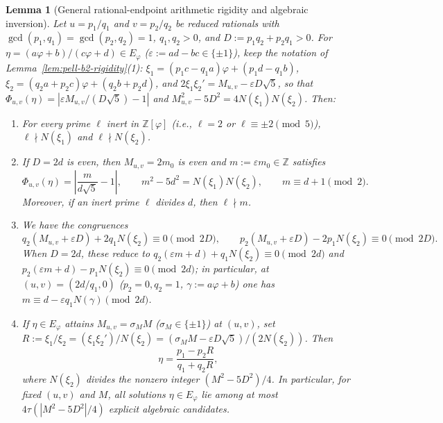 \documentclass[11pt]{amsart}
\newtheorem{lemma}[theorem]{Lemma}
\theoremstyle{definition}
\theoremstyle{remark}
\numberwithin{equation}{section}
\newcommand{\Z}{\mathbb{Z}}
\begin{document}
\begin{lemma}[General rational-endpoint arithmetic rigidity and algebraic inversion]\label{lem:general-endpoint-rigidity}
Let $u=p_1/q_1$ and $v=p_2/q_2$ be reduced rationals with
$\gcd(p_1,q_1)=\gcd(p_2,q_2)=1$, $q_1,q_2>0$, and $D:=p_1q_2+p_2q_1>0$.
For $\eta=(a\varphi+b)/(c\varphi+d)\in E_\varphi$ ($\varepsilon:=ad-bc\in\{\pm1\}$),
keep the notation of Lemma~\ref{lem:pell-b2-rigidity}(1):
$\xi_1=(p_1c-q_1a)\varphi+(p_1d-q_1b)$,
$\xi_2=(q_2a+p_2c)\varphi+(q_2b+p_2d)$, and
$2\xi_1\xi_2'=M_{u,v}-\varepsilon D\sqrt5$, so that
$\Phi_{u,v}(\eta)=|\varepsilon M_{u,v}/(D\sqrt5)-1|$ and
$M_{u,v}^2-5D^2=4N(\xi_1)N(\xi_2)$. Then:
\begin{enumerate}
\item For every prime $\ell$ inert in $\Z[\varphi]$ (i.e., $\ell=2$ or
      $\ell\equiv\pm2\pmod5$), $\ell\nmid N(\xi_1)$ and $\ell\nmid N(\xi_2)$.
\item If $D=2d$ is even, then $M_{u,v}=2m_0$ is even and $m:=\varepsilon m_0\in\Z$
      satisfies
      \[
       \Phi_{u,v}(\eta)=\left|\frac{m}{d\sqrt5}-1\right|,\qquad
       m^2-5d^2=N(\xi_1)N(\xi_2),\qquad m\equiv d+1\pmod2.
      \]
      Moreover, if an inert prime $\ell$ divides $d$, then $\ell\nmid m$.
\item We have the congruences
      \[
       q_2(M_{u,v}+\varepsilon D)+2q_1N(\xi_2)\equiv0\pmod{2D},\qquad
       p_2(M_{u,v}+\varepsilon D)-2p_1N(\xi_2)\equiv0\pmod{2D}.
      \]
      When $D=2d$, these reduce to
      $q_2(\varepsilon m+d)+q_1N(\xi_2)\equiv0\pmod{2d}$ and
      $p_2(\varepsilon m+d)-p_1N(\xi_2)\equiv0\pmod{2d}$; in particular,
      at $(u,v)=(2d/q_1,0)$ ($p_2=0,q_2=1$, $\gamma:=a\varphi+b$) one has
      $m\equiv d-\varepsilon q_1N(\gamma)\pmod{2d}$.
\item If $\eta\in E_\varphi$ attains $M_{u,v}=\sigma_M M$ ($\sigma_M\in\{\pm1\}$)
      at $(u,v)$, set
      $R:=\xi_1/\xi_2=(\xi_1\xi_2')/N(\xi_2)=(\sigma_M M-\varepsilon D\sqrt5)/(2N(\xi_2))$.
      Then
      \[
       \eta=\frac{p_1-p_2R}{q_1+q_2R},
      \]
      where $N(\xi_2)$ divides the nonzero integer $(M^2-5D^2)/4$. In
      particular, for fixed $(u,v)$ and $M$, all solutions $\eta\in E_\varphi$
      lie among at most $4\tau(|M^2-5D^2|/4)$ explicit algebraic candidates.
\end{enumerate}
\end{lemma}
\end{document}
